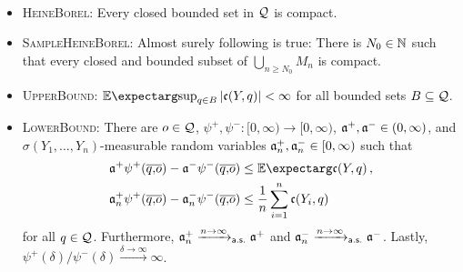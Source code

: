 \begin{assumptions}\mbox{ }
\begin{itemize}
	\item \textsc{HeineBorel}: Every closed bounded set in $\mathcal{Q}$ is compact.
	\item \textsc{SampleHeineBorel}: Almost surely following is true: There is $N_0\in\mathbb{N}$ such that every closed and bounded subset of $\bigcup_{n\geq N_0} M_n$ is compact.
	\item \textsc{UpperBound}: $\Ex{\sup_{q\in B} \abs{\mf c(Y,q)}} < \infty$ for all bounded sets $B\subseteq\mathcal{Q}$.
	\item \textsc{LowerBound}: There are $o\in\mathcal{Q}$, $\psi^+, \psi^- \colon [0,\infty) \to [0,\infty)$, $\mathfrak{a}^+, \mathfrak{a}^- \in(0,\infty)$, and $\sigma(Y_1, \dots, Y_n)$-measurable random variables $\mathfrak{a}^+_n, \mathfrak{a}^-_n \in[0,\infty)$ such that 
	\begin{align*}
		\mf a^+ \psi^+(\ol qo) - \mf a^- \psi^-(\ol qo) &\leq \Ex{\mf c(Y, q)}
		\eqcm\\
		\mf a^+_n \psi^+(\ol qo) - \mf a^-_n \psi^-(\ol qo) &\leq \frac1n \sum_{i=1}^n \mf c(Y_i, q)
	\end{align*}
	for all $q\in\mathcal{Q}$. Furthermore, $\mathfrak{a}^+_n\xrightarrow{n\to\infty}_{\mathsf{a.s.}}\mathfrak{a}^+$ and $\mathfrak{a}^-_n\xrightarrow{n\to\infty}_{\mathsf{a.s.}}\mathfrak{a}^-$. Lastly, $\psi^+(\delta)/\psi^-(\delta)\xrightarrow{\delta\to\infty}\infty$.
	\end{itemize}
\end{assumptions}
%
